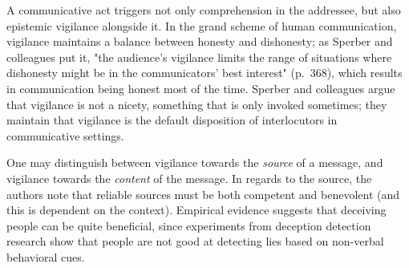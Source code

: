 A communicative act triggers not only comprehension in the addressee, but also epistemic vigilance alongside it.
In the grand scheme of human communication, vigilance maintains a balance between honesty and dishonesty; as Sperber and colleagues put it, "the audience's vigilance limits the range of situations where dishonesty might be in the communicators' best interest" (p.~368), which results in communication being honest most of the time.
Sperber and colleagues argue that vigilance is not a nicety, something that is only invoked sometimes; they maintain that vigilance is the default disposition of interlocutors in communicative settings.

One may distinguish between vigilance towards the \emph{source} of a message, and vigilance towards the \emph{content} of the message.
In regards to the source, the authors note that reliable sources must be both competent and benevolent (and this is dependent on the context).
Empirical evidence suggests that deceiving people can be quite beneficial, since experiments from deception detection research show that people are not good at detecting lies based on non-verbal behavioral cues.



